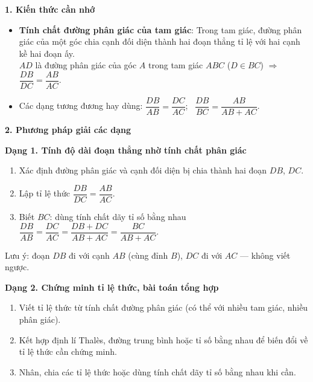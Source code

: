 \textbf{1. Kiến thức cần nhớ}
\begin{itemize}
\item \textbf{Tính chất đường phân giác của tam giác}: Trong tam giác, đường phân giác của một góc chia cạnh đối diện thành hai đoạn thẳng tỉ lệ với hai cạnh kề hai đoạn ấy.\\
$AD$ là đường phân giác của góc $A$ trong tam giác $ABC$ ($D\in BC$) $\Rightarrow$ $\boxed{\dfrac{DB}{DC}=\dfrac{AB}{AC}}$.
\item Các dạng tương đương hay dùng: $\dfrac{DB}{AB}=\dfrac{DC}{AC}$; \ $\dfrac{DB}{BC}=\dfrac{AB}{AB+AC}$.
\end{itemize}

\textbf{2. Phương pháp giải các dạng}

\textbf{Dạng 1. Tính độ dài đoạn thẳng nhờ tính chất phân giác}
\begin{enumerate}
\item Xác định đường phân giác và cạnh đối diện bị chia thành hai đoạn $DB$, $DC$.
\item Lập tỉ lệ thức $\dfrac{DB}{DC}=\dfrac{AB}{AC}$.
\item Biết $BC$: dùng tính chất dãy tỉ số bằng nhau $\dfrac{DB}{AB}=\dfrac{DC}{AC}=\dfrac{DB+DC}{AB+AC}=\dfrac{BC}{AB+AC}$.
\end{enumerate}
Lưu ý: đoạn $DB$ đi với cạnh $AB$ (cùng đỉnh $B$), $DC$ đi với $AC$ — không viết ngược.

\textbf{Dạng 2. Chứng minh tỉ lệ thức, bài toán tổng hợp}
\begin{enumerate}
\item Viết tỉ lệ thức từ tính chất đường phân giác (có thể với nhiều tam giác, nhiều phân giác).
\item Kết hợp định lí Thalès, đường trung bình hoặc tỉ số bằng nhau để biến đổi về tỉ lệ thức cần chứng minh.
\item Nhân, chia các tỉ lệ thức hoặc dùng tính chất dãy tỉ số bằng nhau khi cần.
\end{enumerate}
